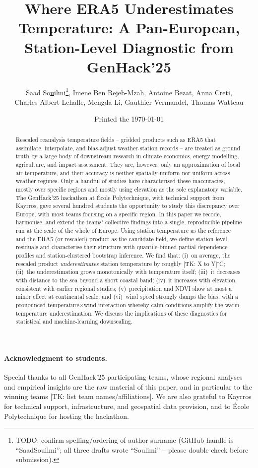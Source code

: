 \documentclass[a4paper,12pt,leqno]{article}
\title{Where ERA5 Underestimates Temperature: A Pan-European,
Station-Level Diagnostic from GenHack'25}
\author{Saad So\underline{u}ilmi\footnote{TODO: confirm spelling/ordering of
author surname (GitHub handle is ``SaadSouilmi''; all three drafts wrote
``Soulimi'' -- please double check before submission).},
Imene Ben Rejeb-Mzah, Antoine Bezat, Anna Creti,\\
Charles-Albert Lehalle, Mengda Li, Gauthier Vermandel, Thomas Watteau}
\date{Printed the \today}
\begin{document}
\maketitle

\begin{abstract}
Rescaled reanalysis temperature fields -- gridded products such as ERA5
that assimilate, interpolate, and bias-adjust weather-station records --
are treated as ground truth by a large body of downstream research in
climate economics, energy modelling, agriculture, and impact assessment.
They are, however, only an approximation of local air temperature, and
their accuracy is neither spatially uniform nor uniform across weather
regimes. Only a handful of studies have characterised these inaccuracies,
mostly over specific regions and mostly using elevation as the sole
explanatory variable. The GenHack'25 hackathon at \'Ecole Polytechnique,
with technical support from Kayrros, gave several hundred students the
opportunity to study this discrepancy over Europe, with most teams
focusing on a specific region. In this paper we recode, harmonise, and
extend the teams' collective findings into a single, reproducible
pipeline run at the scale of the whole of Europe. Using station
temperature as the reference and the ERA5 (or rescaled) product as the
candidate field, we define station-level residuals and characterise
their structure with quantile-binned partial dependence profiles and
station-clustered bootstrap inference. We find that: (i)~on average, the
rescaled product \emph{underestimates} station temperature by roughly
[TK: X to Y]$^\circ$C; (ii)~the underestimation grows monotonically with
temperature itself; (iii)~it decreases with distance to the sea beyond a
short coastal band; (iv)~it increases with elevation, consistent with
earlier regional studies; (v)~precipitation and NDVI show at most a
minor effect at continental scale; and (vi)~wind speed strongly damps
the bias, with a pronounced temperature$\times$wind interaction whereby
calm conditions amplify the warm-temperature underestimation. We discuss
the implications of these diagnostics for statistical and
machine-learning downscaling.
\end{abstract}

\paragraph{Acknowledgment to students.} Special thanks to all GenHack'25
participating teams, whose regional analyses and empirical insights are
the raw material of this paper, and in particular to the winning teams
[TK: list team names/affiliations]. We are also grateful to Kayrros for
technical support, infrastructure, and geospatial data provision, and to
\'Ecole Polytechnique for hosting the hackathon.
\end{document}
